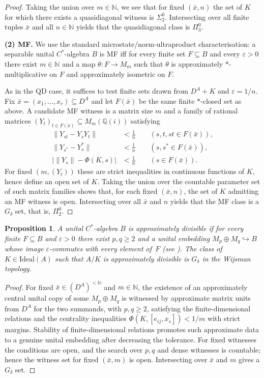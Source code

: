 \documentclass[12pt,fleqn,a4paper]{amsart}
\renewcommand{\ge}{\geqslant}
\numberwithin{equation}{section}
\newtheorem{proposition}[theorem]{Proposition}
\theoremstyle{definition}
\newcommand{\N}{\mathbb{N}}
\newcommand{\Q}{\mathbb{Q}}
\newcommand{\Ideal}{\mathrm{Ideal}}
\begin{document}
\begin{proof}
Taking the union over $m\in\N$, we see that for fixed $(\bar x,n)$ the set of
$K$ for which there exists a quasidiagonal witness is $\Sigma^0_2$.
Intersecting over all finite tuples $\bar x$ and all $n\in\N$ yields that the
quasidiagonal class is $\Pi^0_3$.

\smallskip
\noindent\textbf{(2) MF.}
We use the standard microstate/norm-ultraproduct characterisation:
a separable unital $C^*$-algebra $B$ is MF iff for every finite set
$F\subseteq B$ and every $\varepsilon>0$ there exist $m\in\N$ and a map
$\theta:F\to M_m$ such that $\theta$ is approximately $*$-multiplicative on $F$
and approximately isometric on $F$.

As in the QD case, it suffices to test finite sets drawn from $D^A+K$ and
$\varepsilon=1/n$.
Fix $\bar x=(x_1,\dots,x_r)\subseteq D^A$ and let $F(\bar x)$ be the same finite
$*$-closed set as above.
A candidate MF witness is a matrix size $m$ and a family of rational matrices
$(Y_t)_{t\in F(\bar x)}\subseteq M_m(\Q(i))$
satisfying
\begin{align*}
\|Y_{st}-Y_sY_t\|&<\tfrac{1}{n}\qquad (s,t,st\in F(\bar x)),\\
\|Y_{s^*}-Y_s^*\|&<\tfrac{1}{n}\qquad (s,s^*\in F(\bar x)),\\
\bigl|\|Y_s\|-\Phi(K,s)\bigr|&<\tfrac{1}{n}\qquad (s\in F(\bar x)).
\end{align*}
For fixed $(m,(Y_t))$ these are strict inequalities in continuous functions of $K$,
hence define an open set of $K$.
Taking the union over the countable parameter set of such matrix families shows
that, for each fixed $(\bar x,n)$, the set of $K$ admitting an MF witness is open.
Intersecting over all $\bar x$ and $n$ yields that the MF class is a $G_\delta$ set,
that is, $\Pi^0_2$.
\end{proof}

\begin{proposition}\label{prop:approx-div}
A unital $C^*$-algebra $B$ is \emph{approximately divisible} if for every finite
$F\subseteq B$ and $\varepsilon>0$ there exist $p,q\ge 2$ and a unital embedding
$M_p\oplus M_q\hookrightarrow B$ whose image $\varepsilon$-commutes with every
element of~$F$ (see \cite[V.2.3.1]{BlackadarOA}).  The class of $K\in\Ideal(A)$ such
that $A/K$ is approximately divisible is $G_\delta$ in the Wijsman topology.
\end{proposition}

\begin{proof}
For fixed $\bar x\in(D^A)^{<\N}$ and $m\in\N$, the existence of an approximately
central unital copy of some $M_p\oplus M_q$ is witnessed by approximate matrix units
from $D^A$ for the two summands, with $p,q\ge2$, satisfying the finite-dimensional
relations and the centrality inequalities $\Phi(K,[e_{ij},x_s])<1/m$ with strict
margins.  Stability of finite-dimensional relations promotes such approximate data to
a genuine unital embedding after decreasing the tolerance.  For fixed witnesses the
conditions are open, and the search over $p,q$ and dense witnesses is countable; hence
the witness set for fixed $(\bar x,m)$ is open.  Intersecting over $\bar x$ and $m$
gives a $G_\delta$ set.
\end{proof}
\end{document}
